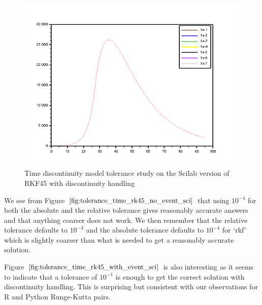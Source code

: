 \begin{figure}[H]
\centering
\includegraphics[width=0.7\linewidth]{./figures/tolerance_time_rk45_with_event_sci}
\caption{Time discontinuity model tolerance study on the Scilab version of RKF45 with discontinuity handling}
\label{fig:tolerance_time_rk45_with_event_sci}
\end{figure}

We see from Figure $\ref{fig:tolerance_time_rk45_no_event_sci}$ that using $10^{-4}$ for both the absolute and the relative tolerance gives reasonably accurate answers and that anything coarser does not work. We then remember that the relative tolerance defaults to $10^{-3}$ and the absolute tolerance defaults to $10^{-4}$ for `rkf' which is slightly coarser than what is needed to get a reasonably accurate solution.

Figure $\ref{fig:tolerance_time_rk45_with_event_sci}$ is also interesting as it seems to indicate that a tolerance of $10^{-1}$ is enough to get the correct solution with discontinuity handling. This is surprising but consistent with our observations for R and Python Runge-Kutta pairs.

